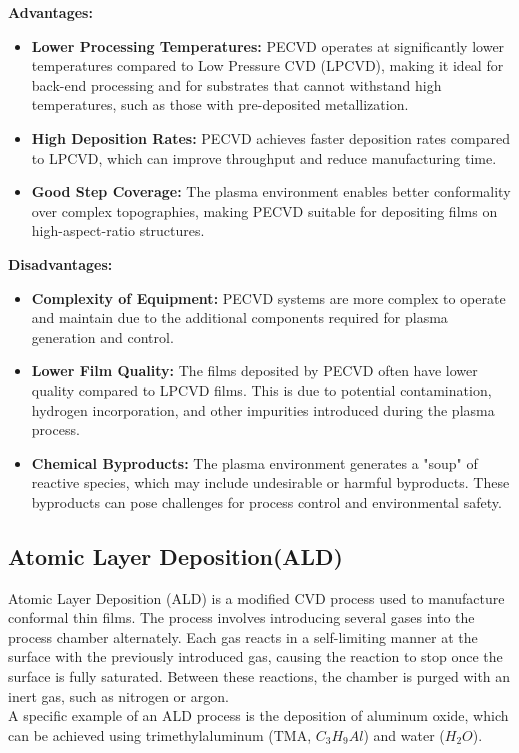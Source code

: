 \documentclass{report}
\begin{document}
\textbf{Advantages:}
\begin{itemize}
    \item \textbf{Lower Processing Temperatures:} PECVD operates at significantly lower temperatures compared to Low Pressure CVD (LPCVD), making it ideal for back-end processing and for substrates that cannot withstand high temperatures, such as those with pre-deposited metallization.
    \item \textbf{High Deposition Rates:} PECVD achieves faster deposition rates compared to LPCVD, which can improve throughput and reduce manufacturing time.
    \item \textbf{Good Step Coverage:} The plasma environment enables better conformality over complex topographies, making PECVD suitable for depositing films on high-aspect-ratio structures.
\end{itemize}

\textbf{Disadvantages:}
\begin{itemize}
    \item \textbf{Complexity of Equipment:} PECVD systems are more complex to operate and maintain due to the additional components required for plasma generation and control.
    \item \textbf{Lower Film Quality:} The films deposited by PECVD often have lower quality compared to LPCVD films. This is due to potential contamination, hydrogen incorporation, and other impurities introduced during the plasma process.
    \item \textbf{Chemical Byproducts:} The plasma environment generates a "soup" of reactive species, which may include undesirable or harmful byproducts. These byproducts can pose challenges for process control and environmental safety.
\end{itemize}


\subsection{Atomic Layer Deposition(ALD)}
Atomic Layer Deposition (ALD) is a modified CVD process used to manufacture conformal thin films. The process involves introducing several gases into the process chamber alternately. Each gas reacts in a self-limiting manner at the surface with the previously introduced gas, causing the reaction to stop once the surface is fully saturated. Between these reactions, the chamber is purged with an inert gas, such as nitrogen or argon.\\
A specific example of an ALD process is the deposition of aluminum oxide, which can be achieved using trimethylaluminum (TMA, $C_{3}H_{9}Al$) and water ($H_{2}O$).
\end{document}
